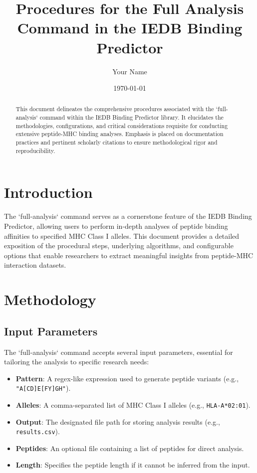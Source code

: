 \documentclass{article}
\title{Procedures for the Full Analysis Command in the IEDB Binding Predictor}
\author{Your Name}
\date{\today}
\begin{document}
\maketitle

\begin{abstract}
This document delineates the comprehensive procedures associated with the `full-analysis` command within the IEDB Binding Predictor library. It elucidates the methodologies, configurations, and critical considerations requisite for conducting extensive peptide-MHC binding analyses. Emphasis is placed on documentation practices and pertinent scholarly citations to ensure methodological rigor and reproducibility.
\end{abstract}

\section{Introduction}
The `full-analysis` command serves as a cornerstone feature of the IEDB Binding Predictor, allowing users to perform in-depth analyses of peptide binding affinities to specified MHC Class I alleles. This document provides a detailed exposition of the procedural steps, underlying algorithms, and configurable options that enable researchers to extract meaningful insights from peptide-MHC interaction datasets.

\section{Methodology}

\subsection{Input Parameters}
The `full-analysis` command accepts several input parameters, essential for tailoring the analysis to specific research needs:
\begin{itemize}
    \item \textbf{Pattern}: A regex-like expression used to generate peptide variants (e.g., \texttt{"A[CD]E[FY]GH"}).
    \item \textbf{Alleles}: A comma-separated list of MHC Class I alleles (e.g., \texttt{HLA-A*02:01}).
    \item \textbf{Output}: The designated file path for storing analysis results (e.g., \texttt{results.csv}).
    \item \textbf{Peptides}: An optional file containing a list of peptides for direct analysis.
    \item \textbf{Length}: Specifies the peptide length if it cannot be inferred from the input.
\end{itemize}
\end{document}
